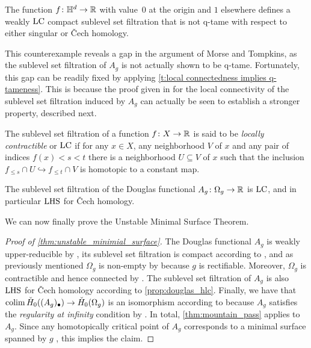 \begin{cor} \label{c:counterexample}
	The function $f \colon \mathbb{H}^d \to \mathbb{R}$ with value~$0$ at the origin and $1$ elsewhere defines a weakly $\mathrm{LC}$ compact sublevel set filtration that is not q-tame with respect to either singular or \v{C}ech homology.
\end{cor}

This counterexample reveals a gap in the argument of Morse and Tompkins, as the sublevel set filtration of $A_g$ is not actually shown to be q-tame.
Fortunately, this gap can be readily fixed by applying \cref{t:local connectedness implies q-tameness}.
This is because the proof given in \cite[Theorem 7.2, p.464]{Morse.1939} for the local connectivity of the sublevel set filtration induced by $A_g$ can actually be seen to establish a stronger property, described next.

\begin{defi}
	The sublevel set filtration of a function $f \colon X \to \mathbb{R}$ is said to be \emph{locally contractible} or \emph{$\mathrm{LC}$} if for any $x \in X$, any neighborhood $V$ of $x$ and any pair of indices $f(x) < s < t$ there is a neighborhood $U \subseteq V$ of $x$ such that the inclusion $f_{\leq s} \cap U \hookrightarrow f_{\leq t} \cap V$ is homotopic to a constant map.
\end{defi}

\begin{prop}
\label{prop:douglas_hlc}
    The sublevel set filtration of the Douglas functional $A_g \colon \Omega_g \to \mathbb{R}$ is $\mathrm{LC}$, and in particular $\mathrm{LHS}$ for \v{C}ech homology.
\end{prop}
%

We can now finally prove the Unstable Minimal Surface Theorem.


\begin{proof}[Proof of \cref{thm:unstable_minimial_surface}]
    The Douglas functional $A_g$ is weakly upper-reducible by \cite[Theorem 5.1]{Morse.1939}, its sublevel set filtration is compact according to \cite[p.~448]{Morse.1939}, and as previously mentioned $\Omega_g$ is non-empty by \cite[p.~267-268]{Douglas.1931} because $g$ is rectifiable.
    Moreover, $\Omega_g$ is contractible and hence connected by \cite[Theorem 4.3]{Morse.1939}.
    The sublevel set filtration of $A_g$ is also $\mathrm{LHS}$ for \v{C}ech homology according to \cref{prop:douglas_hlc}.
    Finally, we have that $\operatorname*{colim} \check{H}_0((A_g)_{\bullet}) \to \check{H}_0(\Omega_g)$ is an isomorphism according to \cite[p.~444]{Morse.1939} because $A_g$ satisfies the \emph{regularity at infinity} condition by \cite[Theorem 4.3]{Morse.1939}.
    In total, \cref{thm:mountain_pass} applies to $A_g$.
    Since any homotopically critical point of $A_g$ corresponds to a minimal surface spanned by $g$ \cite[Theorem 6.2]{Morse.1939}, this implies the claim.
\end{proof}

